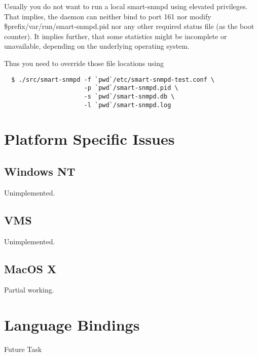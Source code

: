 Usually you do not want to run a local smart-snmpd using elevated
privileges. That implies, the daemon can neither bind to port 161
nor modify \$prefix/var/run/smart-snmpd.pid nor any other required
status file (as the boot counter). It implies further, that some
statistics might be incomplete or unavailable, depending on the
underlying operating system.

Thus you need to override those file locations using
\begin{verbatim}
  $ ./src/smart-snmpd -f `pwd`/etc/smart-snmpd-test.conf \
                      -p `pwd`/smart-snmpd.pid \
                      -s `pwd`/smart-snmpd.db \
                      -l `pwd`/smart-snmpd.log
\end{verbatim}

\section{Platform Specific Issues}

\subsection{Windows NT}

Unimplemented.

\subsection{VMS}

Unimplemented.

\subsection{MacOS X}

Partial working.

\section{Language Bindings}

Future Task



